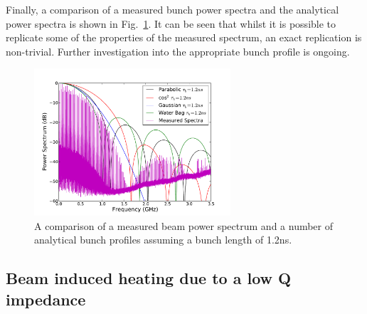 Finally, a comparison of a measured bunch power spectra and the analytical power spectra is shown in Fig.~\ref{fig:power_all}. It can be seen that whilst it is possible to replicate some of the properties of the measured spectrum, an exact replication is non-trivial. Further investigation into the appropriate bunch profile is ongoing.

\begin{figure}
\begin{center}
\includegraphics[width=0.65\textwidth]{figures/wakefields_and_impedance/beam_spectra_power_12ns.pdf}
\end{center}
\label{fig:power_all}
\caption{A comparison of a measured beam power spectrum and a number of analytical bunch profiles assuming a bunch length of 1.2ns.}
\end{figure}




\subsection{Beam induced heating due to a low Q impedance}


